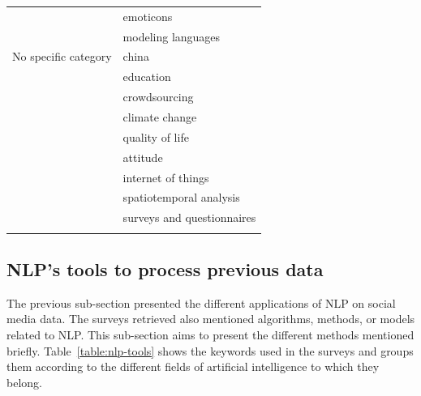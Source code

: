 \begin{center}
\begin{longtable}{ rl }
                                & emoticons                       \\
                                & modeling languages              \\
        No specific category    & china                           \\
                                & education                       \\
                                & crowdsourcing                   \\
                                & climate change                  \\
                                & quality of life                 \\
                                & attitude                        \\
                                & internet of things              \\
                                & spatiotemporal analysis         \\
                                & surveys and questionnaires      \\
        \bottomrule
        \label{table:application-domains}
    \end{longtable}
\end{center}

\subsection{NLP's tools to process previous data}
The previous sub-section presented the different applications of NLP on social media data.
The surveys retrieved also mentioned algorithms, methods, or models related to NLP.
This sub-section aims to present the different methods mentioned briefly.
Table~\ref{table:nlp-tools} shows the keywords used in the surveys and groups them according to the different fields of artificial intelligence to which they belong.

